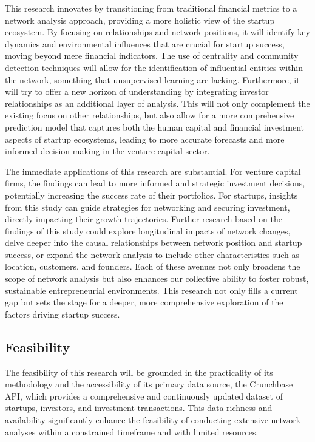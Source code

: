 \documentclass[a4paper,11pt]{article}
\begin{document}
This research innovates by transitioning from traditional financial metrics to a network analysis approach, providing a more holistic view of the startup ecosystem. By focusing on relationships and network positions, it will identify key dynamics and environmental influences that are crucial for startup success, moving beyond mere financial indicators. The use of centrality and community detection techniques will allow for the identification of influential entities within the network, something that unsupervised learning are lacking. Furthermore, it will try to offer a new horizon of understanding by integrating investor relationships as an additional layer of analysis. This will not only complement the existing focus on other relationships, but also allow for a more comprehensive prediction model that captures both the human capital and financial investment aspects of startup ecosystems, leading to more accurate forecasts and more informed decision-making in the venture capital sector.

The immediate applications of this research are substantial. For venture capital firms, the findings can lead to more informed and strategic investment decisions, potentially increasing the success rate of their portfolios. For startups, insights from this study can guide strategies for networking and securing investment, directly impacting their growth trajectories. Further research based on the findings of this study could explore longitudinal impacts of network changes, delve deeper into the causal relationships between network position and startup success, or expand the network analysis to include other characteristics such as location, customers, and founders. Each of these avenues not only broadens the scope of network analysis but also enhances our collective ability to foster robust, sustainable entrepreneurial environments. This research not only fills a current gap but sets the stage for a deeper, more comprehensive exploration of the factors driving startup success.

\subsection{Feasibility}

The feasibility of this research will be grounded in the practicality of its methodology and the accessibility of its primary data source, the Crunchbase API, which provides a comprehensive and continuously updated dataset of startups, investors, and investment transactions. This data richness and availability significantly enhance the feasibility of conducting extensive network analyses within a constrained timeframe and with limited resources.
\end{document}

